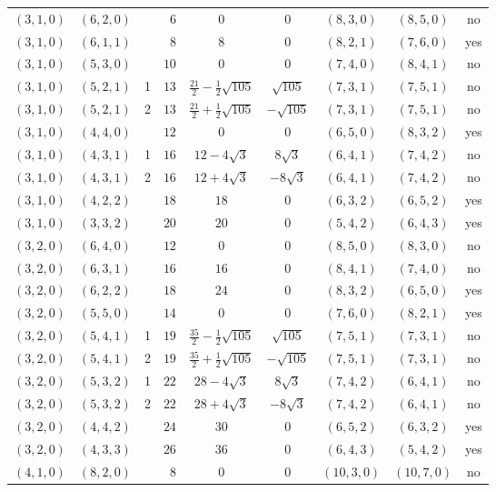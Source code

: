 \documentclass[11pt]{article}
\begin{document}
{\begin{longtable}{lllrccccc}
$(3,1,0)$ & $(6,2,0)$ &  & $6$ & $0$ & $0$ & $(8,3,0)$ & $(8,5,0)$ & no \\
$(3,1,0)$ & $(6,1,1)$ &  & $8$ & $8$ & $0$ & $(8,2,1)$ & $(7,6,0)$ & yes \\
$(3,1,0)$ & $(5,3,0)$ &  & $10$ & $0$ & $0$ & $(7,4,0)$ & $(8,4,1)$ & no \\
$(3,1,0)$ & $(5,2,1)$ & 1 & $13$ & $\frac{21}{2}-\frac{1}{2}\sqrt{105}$ & $\sqrt{105}$ & $(7,3,1)$ & $(7,5,1)$ & no \\
$(3,1,0)$ & $(5,2,1)$ & 2 & $13$ & $\frac{21}{2}+\frac{1}{2}\sqrt{105}$ & $-\sqrt{105}$ & $(7,3,1)$ & $(7,5,1)$ & no \\
$(3,1,0)$ & $(4,4,0)$ &  & $12$ & $0$ & $0$ & $(6,5,0)$ & $(8,3,2)$ & yes \\
$(3,1,0)$ & $(4,3,1)$ & 1 & $16$ & $12-4\sqrt{3}$ & $8\sqrt{3}$ & $(6,4,1)$ & $(7,4,2)$ & no \\
$(3,1,0)$ & $(4,3,1)$ & 2 & $16$ & $12+4\sqrt{3}$ & $-8\sqrt{3}$ & $(6,4,1)$ & $(7,4,2)$ & no \\
$(3,1,0)$ & $(4,2,2)$ &  & $18$ & $18$ & $0$ & $(6,3,2)$ & $(6,5,2)$ & yes \\
$(3,1,0)$ & $(3,3,2)$ &  & $20$ & $20$ & $0$ & $(5,4,2)$ & $(6,4,3)$ & yes \\
$(3,2,0)$ & $(6,4,0)$ &  & $12$ & $0$ & $0$ & $(8,5,0)$ & $(8,3,0)$ & no \\
$(3,2,0)$ & $(6,3,1)$ &  & $16$ & $16$ & $0$ & $(8,4,1)$ & $(7,4,0)$ & no \\
$(3,2,0)$ & $(6,2,2)$ &  & $18$ & $24$ & $0$ & $(8,3,2)$ & $(6,5,0)$ & yes \\
$(3,2,0)$ & $(5,5,0)$ &  & $14$ & $0$ & $0$ & $(7,6,0)$ & $(8,2,1)$ & yes \\
$(3,2,0)$ & $(5,4,1)$ & 1 & $19$ & $\frac{35}{2}-\frac{1}{2}\sqrt{105}$ & $\sqrt{105}$ & $(7,5,1)$ & $(7,3,1)$ & no \\
$(3,2,0)$ & $(5,4,1)$ & 2 & $19$ & $\frac{35}{2}+\frac{1}{2}\sqrt{105}$ & $-\sqrt{105}$ & $(7,5,1)$ & $(7,3,1)$ & no \\
$(3,2,0)$ & $(5,3,2)$ & 1 & $22$ & $28-4\sqrt{3}$ & $8\sqrt{3}$ & $(7,4,2)$ & $(6,4,1)$ & no \\
$(3,2,0)$ & $(5,3,2)$ & 2 & $22$ & $28+4\sqrt{3}$ & $-8\sqrt{3}$ & $(7,4,2)$ & $(6,4,1)$ & no \\
$(3,2,0)$ & $(4,4,2)$ &  & $24$ & $30$ & $0$ & $(6,5,2)$ & $(6,3,2)$ & yes \\
$(3,2,0)$ & $(4,3,3)$ &  & $26$ & $36$ & $0$ & $(6,4,3)$ & $(5,4,2)$ & yes \\
$(4,1,0)$ & $(8,2,0)$ &  & $8$ & $0$ & $0$ & $(10,3,0)$ & $(10,7,0)$ & no \\

\end{longtable}}
\end{document}
